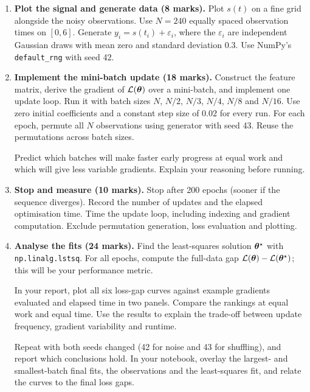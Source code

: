 \documentclass[10pt]{article}
\begin{document}
\begin{enumerate}[label=\textbf{(\alph*)}]
\item \textbf{Plot the signal and generate data (8 marks).} Plot $s(t)$ on a fine grid alongside the noisy observations. Use $N=240$ equally spaced observation times on $[0,6]$. Generate $y_i=s(t_i)+\varepsilon_i$, where the $\varepsilon_i$ are independent Gaussian draws with mean zero and standard deviation $0.3$. Use NumPy's \texttt{default\_rng} with seed 42. 

\item \textbf{Implement the mini-batch update (18 marks).} Construct the feature matrix, derive the gradient of $\mathcal{L}(\bm{\theta})$ over a mini-batch, and implement one update loop. Run it with batch sizes $N$, $N/2$, $N/3$, $N/4$, $N/8$ and $N/16$. Use zero initial coefficients and a constant step size of $0.02$ for every run. For each epoch, permute all $N$ observations using generator with seed 43. Reuse the permutations across batch sizes.

Predict which batches will make faster early progress at equal work and which will give less variable gradients. Explain your reasoning before running.

\item \textbf{Stop and measure (10 marks).} Stop after 200 epochs (sooner if the sequence diverges). Record the number of updates and the elapsed optimisation time. Time the update loop, including indexing and gradient computation. Exclude permutation generation, loss evaluation and plotting.

\item \textbf{Analyse the fits (24 marks).} Find the least-squares solution $\bm{\theta}^\star$ with \texttt{np.linalg.lstsq}. For all epochs, compute the full-data gap $\mathcal{L}(\bm{\theta})-\mathcal{L}(\bm{\theta}^\star)$; this will be your performance metric.

In your report, plot all six loss-gap curves against example gradients evaluated and elapsed time in two panels. Compare the rankings at equal work and equal time. Use the results to explain the trade-off between update frequency, gradient variability and runtime.

Repeat with both seeds changed (42 for noise and 43 for shuffling), and report which conclusions hold. In your notebook, overlay the largest- and smallest-batch final fits, the observations and the least-squares fit, and relate the curves to the final loss gaps.
\end{enumerate}
\end{document}
